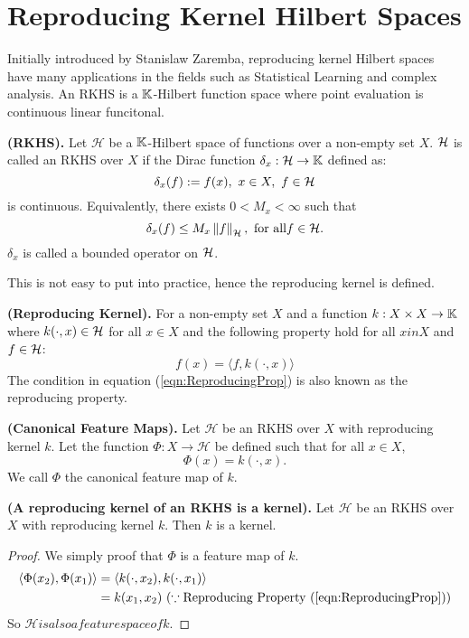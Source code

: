\documentclass[english]{article}
\newcommand\norm[1]{\left\lVert#1\right\rVert}
\newcommand\inner[1]{\langle#1\rangle}
\begin{document}
\section{Reproducing Kernel Hilbert Spaces} \label{sec:RKHS}
Initially introduced by Stanislaw Zaremba, reproducing kernel Hilbert spaces have many applications in the fields such as Statistical Learning and complex analysis. An RKHS is a $\mathbb{K}$-Hilbert function space where point evaluation is continuous linear funcitonal.
\begin{defn}
	\textbf{(RKHS).} Let $\mathcal{H}$ be a $\mathbb{K}$-Hilbert space of functions over a non-empty set $X$. $\mathcal{H}$ is called an RKHS over $X$ if the Dirac function $\delta_x: \mathcal{H} \rightarrow \mathbb{K}$ defined as:
	\[ \delta_x(f) := f(x), ~ x \in X, ~ f \in \mathcal{H} \] is continuous.
	Equivalently, there exists $ 0 < M_x < \infty $ such that
	\[ \delta_x(f) \leq M_x \norm{f}_\mathcal{H}, ~ \text{for all} f \in \HH. \]
	$\delta_x$ is called a bounded operator on $\mathcal{H}$.
\end{defn}
\noindent
This is not easy to put into practice, hence the reproducing kernel is defined.
\begin{defn} \textbf{(Reproducing Kernel).}
	For a non-empty set $X$ and a function $k : X \times X \rightarrow \mathbb{K}$ where $k(\cdot, x) \in \mathcal{H}$ for all $x \in X$ and the following property hold for all $x in X$ and $f \in \mathcal{H}$:
	\begin{equation} \label{eqn:ReproducingProp}
		f(x) = \inner{f, k(\cdot, x)}
	\end{equation}
	The condition in equation (\ref{eqn:ReproducingProp}) is also known as the reproducing property.
\end{defn}
\begin{defn} \label{def:CanFeatureMaps}
	\textbf{(Canonical Feature Maps).}
	Let $\mathcal{H}$ be an RKHS over $X$ with reproducing kernel $k$. Let the function $\Phi: X \rightarrow \mathcal{H}$ be defined such that for all $x \in X$,
	\[ \Phi(x) = k(\cdot, x). \]
	We call $\Phi$ the canonical feature map of $k$.
\end{defn}
\begin{lem}
	\textbf{(A reproducing kernel of an RKHS is a kernel).}
	Let $\mathcal{H}$ be an RKHS over $X$ with reproducing kernel $k$. Then $k$ is a kernel.
\end{lem}
\begin{proof}
	We simply proof that $\Phi$ is a feature map of $k$.
	\begin{equation*}
	\begin{split}
	\inner{\Phi(x_2), \Phi(x_1)} &= \inner{k(\cdot, x_2), k(\cdot, x_1)} \\
		&=  k(x_1, x_2) ~ (\because \text{Reproducing Property } (\ref{eqn:ReproducingProp}))
	\end{split}
	\end{equation*}
	So $\mathcal{H} is also a feature space of k$.
\end{proof}
\end{document}
